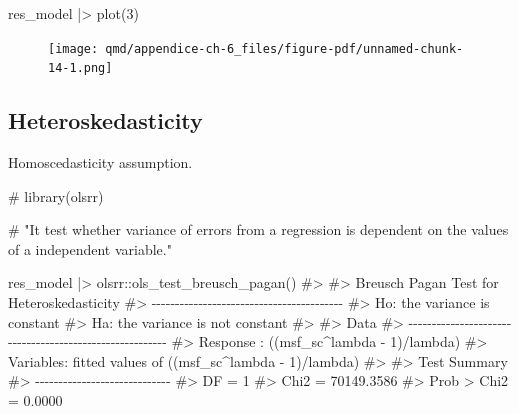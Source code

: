 \documentclass[
  12pt,
  a4paper,
  oneside]{tesesusp}
\newenvironment{Shaded}{\begin{snugshade}}{\end{snugshade}}
\newcommand{\CommentTok}[1]{\textcolor[rgb]{0.37,0.37,0.37}{#1}}
\newcommand{\DecValTok}[1]{\textcolor[rgb]{0.68,0.00,0.00}{#1}}
\newcommand{\FunctionTok}[1]{\textcolor[rgb]{0.28,0.35,0.67}{#1}}
\newcommand{\NormalTok}[1]{\textcolor[rgb]{0.00,0.23,0.31}{#1}}
\newcommand{\SpecialCharTok}[1]{\textcolor[rgb]{0.37,0.37,0.37}{#1}}
\begin{document}
\begin{Shaded}
\begin{Highlighting}[numbers=left,,]
\NormalTok{res\_model }\SpecialCharTok{|\textgreater{}} \FunctionTok{plot}\NormalTok{(}\DecValTok{3}\NormalTok{)}
\end{Highlighting}
\end{Shaded}

\begin{figure}[H]

{\centering \texttt{[image: qmd/appendice-ch-6\_files/figure-pdf/unnamed-chunk-14-1.png]}

}

\end{figure}

\hypertarget{heteroskedasticity}{%
\subsection{Heteroskedasticity}\label{heteroskedasticity}}

Homoscedasticity assumption.

\begin{Shaded}
\begin{Highlighting}[numbers=left,,]
\CommentTok{\# library(olsrr)}

\CommentTok{\# "It test whether variance of errors from a regression is dependent on the values of a independent variable."}

\NormalTok{res\_model }\SpecialCharTok{|\textgreater{}}\NormalTok{ olsrr}\SpecialCharTok{::}\FunctionTok{ols\_test\_breusch\_pagan}\NormalTok{()}
\CommentTok{\#\textgreater{} }
\CommentTok{\#\textgreater{}  Breusch Pagan Test for Heteroskedasticity}
\CommentTok{\#\textgreater{}  {-}{-}{-}{-}{-}{-}{-}{-}{-}{-}{-}{-}{-}{-}{-}{-}{-}{-}{-}{-}{-}{-}{-}{-}{-}{-}{-}{-}{-}{-}{-}{-}{-}{-}{-}{-}{-}{-}{-}{-}{-}}
\CommentTok{\#\textgreater{}  Ho: the variance is constant            }
\CommentTok{\#\textgreater{}  Ha: the variance is not constant        }
\CommentTok{\#\textgreater{} }
\CommentTok{\#\textgreater{}                           Data                           }
\CommentTok{\#\textgreater{}  {-}{-}{-}{-}{-}{-}{-}{-}{-}{-}{-}{-}{-}{-}{-}{-}{-}{-}{-}{-}{-}{-}{-}{-}{-}{-}{-}{-}{-}{-}{-}{-}{-}{-}{-}{-}{-}{-}{-}{-}{-}{-}{-}{-}{-}{-}{-}{-}{-}{-}{-}{-}{-}{-}{-}{-}}
\CommentTok{\#\textgreater{}  Response : ((msf\_sc\^{}lambda {-} 1)/lambda) }
\CommentTok{\#\textgreater{}  Variables: fitted values of ((msf\_sc\^{}lambda {-} 1)/lambda) }
\CommentTok{\#\textgreater{} }
\CommentTok{\#\textgreater{}         Test Summary          }
\CommentTok{\#\textgreater{}  {-}{-}{-}{-}{-}{-}{-}{-}{-}{-}{-}{-}{-}{-}{-}{-}{-}{-}{-}{-}{-}{-}{-}{-}{-}{-}{-}{-}{-}}
\CommentTok{\#\textgreater{}  DF            =    1 }
\CommentTok{\#\textgreater{}  Chi2          =    70149.3586 }
\CommentTok{\#\textgreater{}  Prob \textgreater{} Chi2   =    0.0000}
\end{Highlighting}
\end{Shaded}
\end{document}
